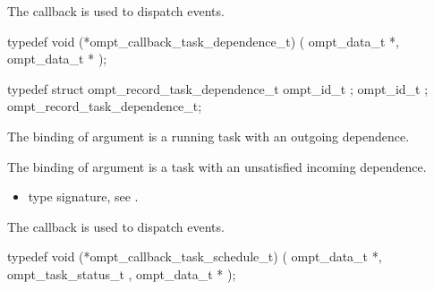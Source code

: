 \label{sec:ompt_callback_task_dependence_t}
\summary
The  callback is used to dispatch
 events.

\format

\begin{ccppspecific}
\begin{omptCallback}
typedef void (*ompt_callback_task_dependence_t) (
  ompt_data_t *,
  ompt_data_t *
);
\end{omptCallback}
\end{ccppspecific}


\record

\begin{ccppspecific}
\begin{omptRecord}
typedef struct ompt_record_task_dependence_t {
  ompt_id_t ;
  ompt_id_t ;
} ompt_record_task_dependence_t;
\end{omptRecord}
\end{ccppspecific}


\argdesc

The binding of argument  is a running task
with an outgoing dependence.

The binding of argument  is a task with an
unsatisfied incoming dependence.


\crossreferences
\begin{itemize}
\item {} type signature, see
.
\end{itemize}



\label{sec:ompt_callback_task_schedule_t}
\summary
The  callback is used to dispatch
 events.

\format

\begin{ccppspecific}
\begin{omptCallback}
typedef void (*ompt_callback_task_schedule_t) (
  ompt_data_t *,
  ompt_task_status_t ,
  ompt_data_t *
);
\end{omptCallback}
\end{ccppspecific}


